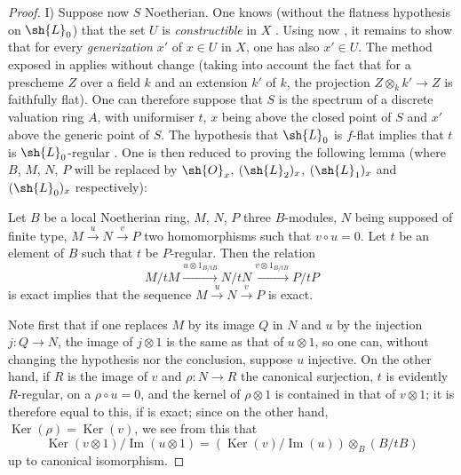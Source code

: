 \begin{proof}
\medskip
I) Suppose now $S$ Noetherian.
One knows (without the flatness hypothesis on $\sh{L}_0$) that the set $U$ is \emph{constructible} in $X$ .
Using now , it remains to show that for every \emph{generization} $x'$ of $x\in U$ in $X$, one has also $x'\in U$.
The method exposed in  applies without change (taking into account the fact that for a prescheme $Z$ over a field $k$ and an extension $k'$ of $k$, the projection $Z\otimes_k k'\to Z$ is faithfully flat).
One can therefore suppose that $S$ is the spectrum of a discrete valuation ring $A$, with uniformiser $t$, $x$ being above the closed point of $S$ and $x'$ above the generic point of $S$.
The hypothesis that $\sh{L}_0$ is $f$-flat implies that $t$ is $\sh{L}_0$-regular .
One is then reduced to proving the following lemma (where $B$, $M$, $N$, $P$ will be replaced by $\sh{O}_x$, $(\sh{L}_2)_x$, $(\sh{L}_1)_x$ and $(\sh{L}_0)_x$ respectively):

\begin{lemma}[12.3.3.1]
\label{IV.12.3.3.1}
Let $B$ be a local Noetherian ring, $M$, $N$, $P$ three $B$-modules, $N$ being supposed of finite type, $M\xrightarrow{u} N\xrightarrow{v} P$ two homomorphisms such that $v\circ u=0$.
Let $t$ be an element of $B$ such that $t$ be $P$-regular.
Then the relation
\begin{equation}
\label{IV.12.3.3.2}
M/tM \xrightarrow{u\otimes 1_{B/tB}} N/tN \xrightarrow{v\otimes 1_{B/tB}} P/tP
\end{equation}
is exact implies that the sequence $M\xrightarrow{u} N\xrightarrow{v} P$ is exact.
\end{lemma}

Note first that if one replaces $M$ by its image $Q$ in $N$ and $u$ by the injection $j:Q\to N$, the image of $j\otimes 1$ is the same as that of $u\otimes 1$, so one can, without changing the hypothesis nor the conclusion, suppose $u$ injective.
On the other hand, if $R$ is the image of $v$ and $\rho:N\to R$ the canonical surjection, $t$ is evidently $R$-regular, on a $\rho\circ u=0$, and the kernel of $\rho\otimes 1$ is contained in that of $v\otimes 1$; it is therefore equal to this, if  is exact; since on the other hand, $\operatorname{Ker}(\rho)=\operatorname{Ker}(v)$, we see from this that
\begin{equation}
\label{IV.12.3.3.4}
\operatorname{Ker}(v\otimes 1)/\operatorname{Im}(u\otimes 1) = (\operatorname{Ker}(v)/\operatorname{Im}(u))\otimes_B(B/tB)
\end{equation}
up to canonical isomorphism.


\end{proof}
